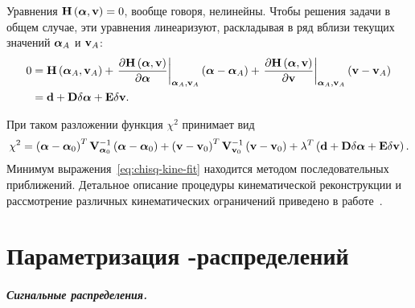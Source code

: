 Уравнения $\mathbf{H}\left(\boldsymbol{\alpha},\mathbf{v}\right)=0$, вообще говоря, нелинейны.  Чтобы решения задачи в общем случае, эти уравнения линеаризуют, раскладывая в ряд вблизи текущих значений $\boldsymbol{\alpha}_A$ и $\mathbf{v}_A$:
\begin{equation}
\begin{split}
 0 & = \mathbf{H}\left(\boldsymbol{\alpha}_A,\mathbf{v}_A\right) 
   + \left.\frac{\partial\mathbf{H}\left(\boldsymbol{\alpha},\mathbf{v}\right)}{\partial\boldsymbol{\alpha}}\right|_{\boldsymbol{\alpha}_A,\mathbf{v}_A}\left( \boldsymbol{\alpha} - \boldsymbol{\alpha}_A \right)
   + \left.\frac{\partial\mathbf{H}\left(\boldsymbol{\alpha},\mathbf{v}\right)}{\partial \mathbf{v}}\right|_{\boldsymbol{\alpha}_A,\mathbf{v}_A}\left(  \mathbf{v} -  \mathbf{v}_A \right)\\
   & = \mathbf{d} + \mathbf{D}\delta\boldsymbol{\alpha} + \mathbf{E}\delta\mathbf{v}.
\end{split}
\end{equation}

При таком разложении функция $\chi^2$ принимает вид
\begin{equation}\label{eq:chisq-kine-fit}
 \chi^2 = \left( \boldsymbol{\alpha} - \boldsymbol{\alpha}_0 \right)^T\mathbf{V}_{\boldsymbol{\alpha}_0}^{-1}\left( \boldsymbol{\alpha} - \boldsymbol{\alpha}_0 \right) 
        + \left(  \mathbf{v} -  \mathbf{v}_0 \right)^T\mathbf{V}_{ \mathbf{v}_0}^{-1}\left(  \mathbf{v} -  \mathbf{v}_0 \right) 
        + \lambda^T\left( \mathbf{d} + \mathbf{D}\delta\boldsymbol{\alpha} + \mathbf{E}\delta\mathbf{v}\right).
\end{equation}
Минимум выражения~\eqref{eq:chisq-kine-fit} находится методом последовательных приближений.  Детальное описание процедуры кинематической реконструкции и рассмотрение различных кинематических ограничений приведено в работе~\cite{Avery}.

\chapter{Параметризация \de-\mbc распределений}\label{sec:param}
\paragraph{Сигнальные распределения.}

